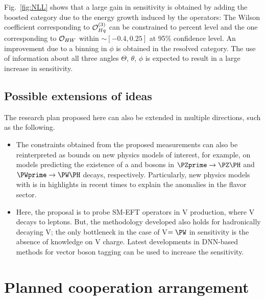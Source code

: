 \documentclass[a4paper,11pt]{article}
\renewcommand{\PV}{{{{V}}}\xspace}
\newcommand{\VH}{{{\PV}{\PH}}\xspace}
\begin{document}
Fig.~\ref{fig:NLL} shows that a large gain in sensitivity is obtained by adding the boosted category due to the energy growth induced by the operators:
The Wilson coefficient corresponding to ${\cal O}^{(3)}_{Hq}$ can be constrained to percent level and the one corresponding to ${\cal O}_{HW}$ within $\sim [-0.4,0.25]$ at 95\% confidence level. 
An improvement due to a binning in $\phi$ is obtained in the resolved category. 
The use of information about all three angles $\Theta$, $\theta$, $\phi$ is expected to result in a large increase in sensitivity. %

\subsection{Possible extensions of ideas}

The research plan proposed here can also be extended in multiple directions, such as the following. 

\begin{itemize}
\item The constraints obtained from  the proposed measurements can also be reinterpreted as bounds on new physics models of interest, for example, on models predicting the existence of a \PZprime and \PWprime bosons in $\PZprime \to \PZ \PH$ and $\PWprime \to \PW \PH$ decays, respectively.
Particularly, new physics models with \PZprime is in highlights in recent times to explain the anomalies in the flavor sector. 

\item Here, the proposal is to probe SM-EFT operators in \VH production, where \PV decays to leptons. 
But, the methodology developed also holds for hadronically decaying \PV; 
the only bottleneck in the case of {\PV}$ ={\PW}$ in sensitivity is the absence of knowledge on \PV charge. 
Latest developments in DNN-based methods for vector boson tagging can be used to increase the sensitivity. 

\end{itemize}


\section{Planned cooperation arrangement} 
\end{document}
